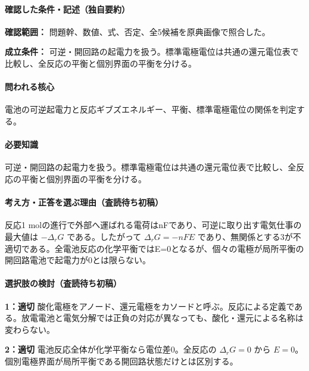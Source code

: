 \paragraph{確認した条件・記述（独自要約）}\mbox{}\par

\noindent\textbf{確認範囲：} 問題幹、数値、式、否定、全5候補を原典画像で照合した。\par

\noindent\textbf{成立条件：} 可逆・開回路の起電力を扱う。標準電極電位は共通の還元電位表で比較し、全反応の平衡と個別界面の平衡を分ける。\par

\paragraph{問われる核心} 電池の可逆起電力と反応ギブズエネルギー、平衡、標準電極電位の関係を判定する。

\paragraph{必要知識} 可逆・開回路の起電力を扱う。標準電極電位は共通の還元電位表で比較し、全反応の平衡と個別界面の平衡を分ける。

\paragraph{考え方・正答を選ぶ理由（査読待ち初稿）} 反応1 molの進行で外部へ運ばれる電荷はnFであり、可逆に取り出す電気仕事の最大値は \(-\Delta_rG\) である。したがって \(\Delta_rG=-nFE\) であり、無関係とする3が不適切である。全電池反応の化学平衡ではE=\allowbreak{}0となるが、個々の電極が局所平衡の開回路電池で起電力が0とは限らない。

\paragraph{選択肢の検討（査読待ち初稿）}\mbox{}\par

\noindent\textbf{1：適切} 酸化電極をアノード、還元電極をカソードと呼ぶ。反応による定義である。放電電池と電気分解では正負の対応が異なっても、酸化・還元による名称は変わらない。\par

\noindent\textbf{2：適切} 電池反応全体が化学平衡なら電位差0。全反応の \(\Delta_rG=0\) から \(E=0\)。個別電極界面が局所平衡である開回路状態だけとは区別する。\par

